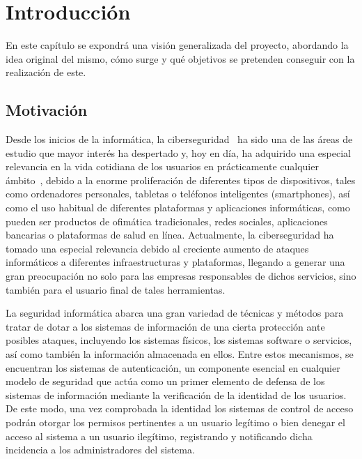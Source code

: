 \chapter{Introducción}
\label{sec:intro}

En este capítulo se expondrá una visión generalizada del proyecto, abordando la idea original del mismo, cómo surge y qué objetivos se pretenden conseguir con la realización de este.

\section{Motivación}
\label{sec:intro:motivacion}

Desde los inicios de la informática, la ciberseguridad~\cite{8906, stallings2012computer} ha sido una de las áreas de estudio que mayor interés ha despertado y, hoy en día, ha adquirido una especial relevancia en la vida cotidiana de los usuarios en prácticamente cualquier ámbito~\cite{EurostatComputerEmployees, EurostatComputerIndivual}, debido a la enorme proliferación de diferentes tipos de dispositivos, tales como ordenadores personales, tabletas o teléfonos inteligentes (smartphones), así como el uso habitual de diferentes plataformas y aplicaciones informáticas, como pueden ser productos de ofimática tradicionales, redes sociales, aplicaciones bancarias o plataformas de salud en línea. Actualmente, la ciberseguridad ha tomado una especial relevancia debido al creciente aumento de ataques informáticos a diferentes infraestructuras y plataformas, llegando a generar una gran preocupación no solo para las empresas responsables de dichos servicios, sino también para el usuario final de tales herramientas.

La seguridad informática abarca una gran variedad de técnicas y métodos para tratar de dotar a los sistemas de información de una cierta protección ante posibles ataques, incluyendo los sistemas físicos, los sistemas software o servicios, así como también la información almacenada en ellos. Entre estos mecanismos, se encuentran los sistemas de autenticación, un componente esencial en cualquier modelo de seguridad que actúa como un primer elemento de defensa de los sistemas de información mediante la verificación de la identidad de los usuarios. De este modo, una vez comprobada la identidad los sistemas de control de acceso podrán otorgar los permisos pertinentes a un usuario legítimo o bien denegar el acceso al sistema a un usuario ilegítimo, registrando y notificando dicha incidencia a los administradores del sistema.

